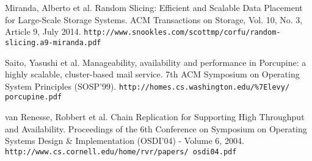 \documentclass[preprint,10pt]{sigplanconf}
\begin{document}
\begin{thebibliography}{}
Miranda, Alberto et al.
Random Slicing: Efficient and Scalable Data Placement for Large-Scale Storage Systems.
ACM Transactions on Storage, Vol. 10, No. 3, Article 9, July 2014.
{\tt http://www.snookles.com/scottmp/corfu/random- slicing.a9-miranda.pdf}

Saito, Yasushi et al.
Manageability, availability and performance in Porcupine: a highly scalable, cluster-based mail service.
7th ACM Symposium on Operating System Principles (SOSP’99).
{\tt http://homes.cs.washington.edu/\%7Elevy/ porcupine.pdf}

van Renesse, Robbert et al.
Chain Replication for Supporting High Throughput and Availability.
Proceedings of the 6th Conference on Symposium on Operating Systems
Design \& Implementation (OSDI'04) - Volume 6, 2004.
{\tt http://www.cs.cornell.edu/home/rvr/papers/ osdi04.pdf}

\end{thebibliography}
\end{document}
